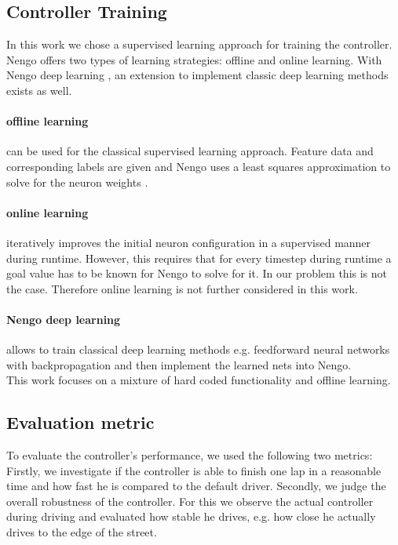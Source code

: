 \documentclass[10pt,a4paper,twoside,journal]{IEEEtran}
\begin{document}
\subsection{Controller Training}
In this work we chose a supervised learning approach for training the controller. Nengo offers two types of learning strategies: offline and online learning.
With Nengo deep learning \cite{nengo_dl}, an extension to implement classic deep learning methods exists as well.

\paragraph{offline learning} can be used for the classical supervised learning approach. Feature data and corresponding labels are given and Nengo uses a least squares approximation to solve for the neuron weights \cite{nef}.

\paragraph{online learning} iteratively improves the initial neuron configuration in a supervised manner during runtime. However, this requires that for every timestep during runtime a goal value has to be known for Nengo to solve for it. In our problem this is not the case. Therefore online learning is not further considered in this work.

\paragraph{Nengo deep learning} allows to train classical deep learning methods e.g. feedforward neural networks with backpropagation and then implement the learned nets into Nengo. \\
This work focuses on a mixture of hard coded functionality and offline learning.

\subsection{Evaluation metric}
To evaluate the controller's performance, we used the following two metrics: Firstly, we investigate if the controller is able to finish one lap in a reasonable time and how fast he is compared to the default driver. Secondly, we judge the overall robustness of the controller. For this we observe the actual controller during driving and evaluated how stable he drives, e.g. how close he actually drives to the edge of the street.
\end{document}
